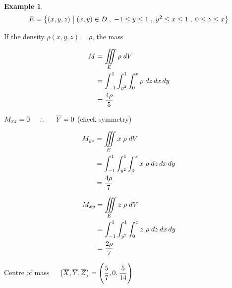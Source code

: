 \documentclass[11pt,a4paper]{article}
\theoremstyle{definition}
\newtheorem{exa}[thm]{Example}
\begin{document}
\begin{exa}
$$E = \big\{(x,y,z)\hspace{0.1cm} \big| \hspace{0.1cm} (x,y)\in D \hspace{0.1cm} , \hspace{0.1cm} -1\leq y\leq 1\hspace{0.1cm} , \hspace{0.1cm} y^2 \leq x \leq 1 \hspace{0.1cm}, \hspace{0.1cm} 0 \leq z \leq x\big\}$$

If the density $\rho (x,y,z) = \rho$, the mass 

\begin{align*}
M & = \iiint\limits_E \rho \hspace{0.1cm} dV\\
& = \int^1_{-1}\int^1_{y^2}\int^x_0\rho \hspace{0.1cm} dz\,dx\,dy\\
& = \frac{4\rho}{5}\\
\end{align*}

$M_{xz} =0\hspace{0.4cm}\therefore\hspace{0.5cm} \overline{Y} = 0$ (check symmetry)

\begin{align*}
M_{yz} & = \iiint\limits_E x\hspace{0.1cm} \rho \hspace{0.1cm} dV\\
& = \int^1_{-1}\int^1_{y^2}\int^x_0 x\hspace{0.1cm}\rho \hspace{0.1cm} dz\, dx\, dy\\
& = \frac{4\rho}{7}\\
\end{align*}

\begin{align*}
M_{xy} & = \iiint\limits_E z\hspace{0.1cm} \rho \hspace{0.1cm} dV\\
& = \int^1_{-1}\int^1_{y^2}\int^x_0z \hspace{0.1cm}\rho \hspace{0.1cm} dz\,dx\,dy\\
& = \frac{2\rho}{7}\\
\end{align*}

Centre of mass $\hspace{0.4cm} \displaystyle{\big(\overline{X},\overline{Y}, \overline{Z}\big) = \Bigg(\frac{5}{7}, 0, \frac{5}{14}\Bigg)}$\
\end{exa}
\end{document}
